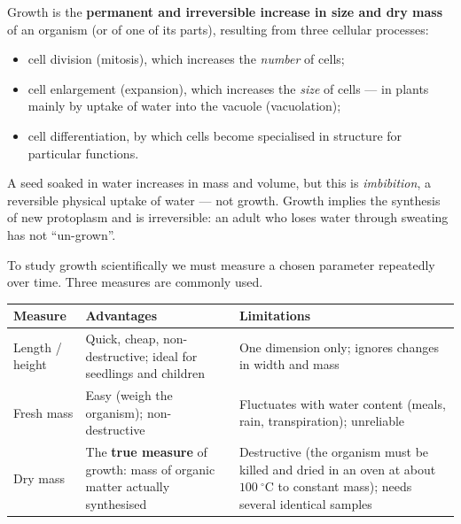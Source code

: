 \documentclass[11pt]{article}
\newcommand{\cle}[1]{{\popxbold\color{popdark}#1}}
\newcounter{popsec}
\newcounter{popsub}
\newcommand{\courssub}[1]{%
  \stepcounter{popsub}%
  \par\vspace{9pt}\noindent{\popxbold\fontsize{11.5}{13}\selectfont\color{popink}{\color{poporange}\thepopsec.\thepopsub}\hspace{6pt}#1}\par\nopagebreak\vspace{4pt}
}
\begin{document}
\begin{definition}[Growth]
\cle{Growth} is the \textbf{permanent and irreversible increase in size and dry mass} of an organism (or of one of its parts), resulting from three cellular processes:
\begin{itemize}
\item \cle{cell division} (mitosis), which increases the \emph{number} of cells;
\item \cle{cell enlargement} (expansion), which increases the \emph{size} of cells --- in plants mainly by uptake of water into the vacuole (vacuolation);
\item \cle{cell differentiation}, by which cells become specialised in structure for particular functions.
\end{itemize}
\end{definition}

\begin{attention}
A seed soaked in water increases in mass and volume, but this is \emph{imbibition}, a reversible physical uptake of water --- not growth. Growth implies the synthesis of new protoplasm and is irreversible: an adult who loses water through sweating has not ``un-grown''.
\end{attention}

\courssub{Measuring Growth}

To study growth scientifically we must measure a chosen parameter repeatedly over time. Three measures are commonly used.

\begin{center}
\begin{tabularx}{\linewidth}{|l|X|X|}
\hline
\rowcolor{popblueL} \textbf{Measure} & \textbf{Advantages} & \textbf{Limitations} \\
\hline
Length / height & Quick, cheap, non-destructive; ideal for seedlings and children & One dimension only; ignores changes in width and mass \\
\hline
Fresh mass & Easy (weigh the organism); non-destructive & Fluctuates with water content (meals, rain, transpiration); unreliable \\
\hline
Dry mass & The \textbf{true measure} of growth: mass of organic matter actually synthesised & Destructive (the organism must be killed and dried in an oven at about $\SI{100}{\ensuremath{{}^{\circ}\mathrm{C}}}$ to constant mass); needs several identical samples \\
\hline
\end{tabularx}
\end{center}
\end{document}
